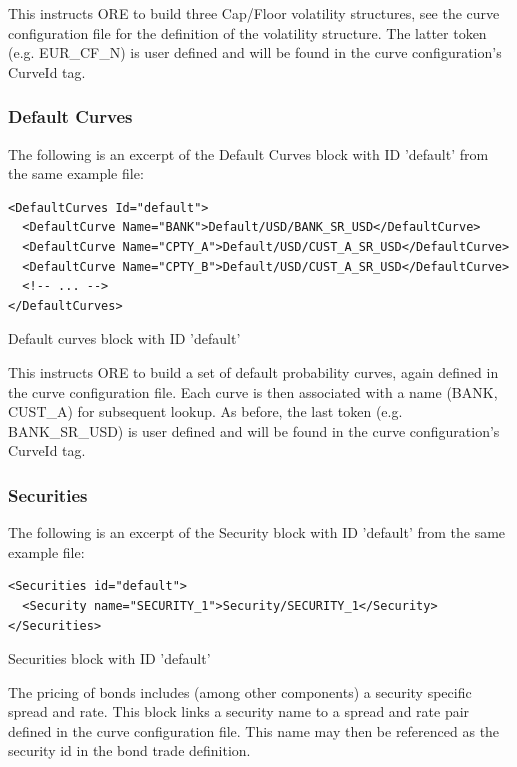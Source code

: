 \documentclass[12pt, a4paper]{article}
\begin{document}
This instructs ORE to build three Cap/Floor volatility structures, see the curve configuration file for the definition
of the volatility structure. The latter token (e.g. EUR\_CF\_N) is user defined and will be found in the curve
configuration's CurveId tag.

\subsubsection{Default Curves}

The following is an excerpt of the Default Curves block with ID 'default' from the same example file:

\begin{listing}[H]
\begin{verbatim}
<DefaultCurves Id="default">
  <DefaultCurve Name="BANK">Default/USD/BANK_SR_USD</DefaultCurve>
  <DefaultCurve Name="CPTY_A">Default/USD/CUST_A_SR_USD</DefaultCurve>
  <DefaultCurve Name="CPTY_B">Default/USD/CUST_A_SR_USD</DefaultCurve>
  <!-- ... -->
</DefaultCurves>
\end{verbatim}
\caption{Default curves block with ID 'default'}
\label{lst:defaultcurve_spec}
\end{listing}

This instructs ORE to build a set of default probability curves, again defined in the curve configuration file. Each
curve is then associated with a name (BANK, CUST\_A) for subsequent lookup.  As before, the last token
(e.g. BANK\_SR\_USD) is user defined and will be found in the curve configuration's CurveId tag.

\subsubsection{Securities}\label{sssec:securities}

The following is an excerpt of the Security block with ID 'default' from the same example file:

\begin{listing}[H]
	\begin{verbatim}
<Securities id="default">
  <Security name="SECURITY_1">Security/SECURITY_1</Security>
</Securities>
	\end{verbatim}
	\caption{Securities block with ID 'default'}
	\label{lst:secspread_spec}
\end{listing}

The pricing of bonds includes (among other components) a security specific spread and rate. 
This block links a security name to a spread and rate pair defined in the curve configuration file. This name may then be referenced 
as the security id in the bond trade definition.
\end{document}

